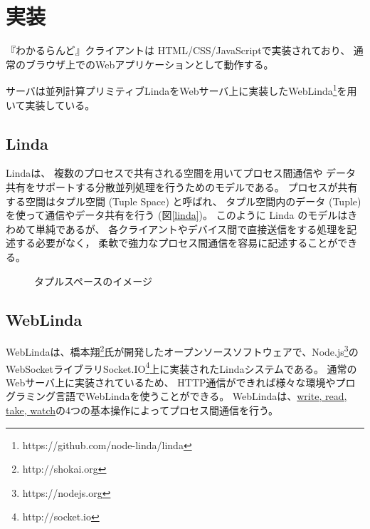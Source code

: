 \section{実装}

『わかるらんど』クライアントは
HTML/CSS/JavaScriptで実装されており、
通常のブラウザ上でのWebアプリケーションとして動作する。

サーバは並列計算プリミティブLindaをWebサーバ上に実装したWebLinda\footnote{https://github.com/node-linda/linda}を用いて実装している。

\subsection{Linda}
Linda\cite{Carriero:1989:LC:63334.63337}は、
複数のプロセスで共有される空間を用いてプロセス間通信や
データ共有をサポートする分散並列処理を行うためのモデルである。
プロセスが共有する空間はタプル空間 (Tuple Space) と呼ばれ、
タプル空間内のデータ (Tuple) を使って通信やデータ共有を行う (図\ref{linda})。
このように Linda のモデルはきわめて単純であるが、
各クライアントやデバイス間で直接送信をする処理を記述する必要がなく，
柔軟で強力なプロセス間通信を容易に記述することができる。

\begin{figure}[h]
\centering
{}
\caption{タプルスペースのイメージ}
\label{button}
\end{figure}

\subsection{WebLinda}
WebLindaは、橋本翔\footnote{http://shokai.org}氏が開発したオープンソースソフトウェアで、Node.js\footnote{https://nodejs.org}のWebSocketライブラリSocket.IO\footnote{http://socket.io}上に実装されたLindaシステムである。
通常のWebサーバ上に実装されているため、
HTTP通信ができれば様々な環境やプログラミング言語でWebLindaを使うことができる。
WebLindaは、\url{write, read, take, watch}の4つの基本操作によってプロセス間通信を行う。

